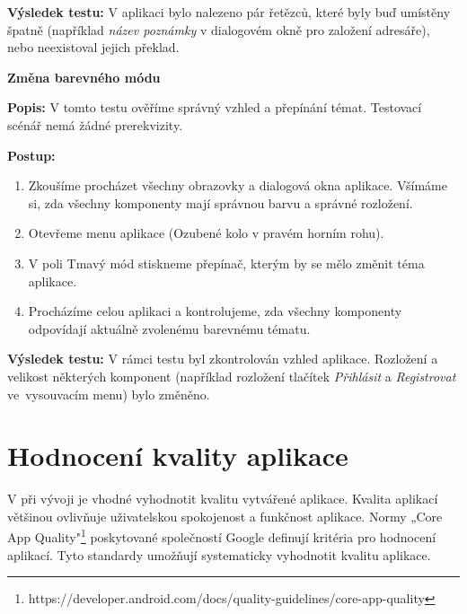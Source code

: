 \documentclass[czech, bc, kiv, he, iso690numb]{fasthesis}
\begin{document}
\noindent \textbf{Výsledek testu:} V aplikaci bylo nalezeno pár řetězců, které byly buď umístěny špatně (například \textit{název poznámky} v dialogovém okně pro založení adresáře), nebo neexistoval jejich překlad. 

\vspace{0.1cm}


\noindent \textbf{Změna barevného módu}

\vspace{0.1cm}

\noindent \textbf{Popis:} V tomto testu ověříme správný vzhled a přepínání témat. Testovací scénář nemá žádné prerekvizity.

\vspace{0.1cm}

\noindent \textbf{Postup:}

\begin{enumerate}[label=\arabic*., itemsep=0pt, topsep=0pt, parsep=0pt]
    \item Zkoušíme procházet všechny obrazovky a dialogová okna aplikace. Všímáme si, zda všechny komponenty mají správnou barvu a správné rozložení.
    \item Otevřeme menu aplikace (Ozubené kolo v pravém horním rohu).
    \item V poli Tmavý mód stiskneme přepínač, kterým by se mělo změnit téma aplikace.
    \item Procházíme celou aplikaci a kontrolujeme, zda všechny komponenty odpovídají aktuálně zvolenému barevnému tématu.
\end{enumerate}

\noindent \textbf{Výsledek testu:} V rámci testu byl zkontrolován vzhled aplikace. Rozložení a velikost některých komponent (například rozložení tlačítek \textit{Přihlásit} a \textit{Registrovat} ve~vysouvacím menu) bylo změněno. 

\newpage

\section{Hodnocení kvality aplikace}

V při vývoji je vhodné vyhodnotit kvalitu vytvářené aplikace. Kvalita aplikací většinou ovlivňuje uživatelskou spokojenost a funkčnost aplikace. Normy „Core App Quality"\footnote{https://developer.android.com/docs/quality-guidelines/core-app-quality} poskytované společností Google definují kritéria pro hodnocení aplikací. Tyto standardy umožňují systematicky vyhodnotit kvalitu aplikace.
\end{document}
